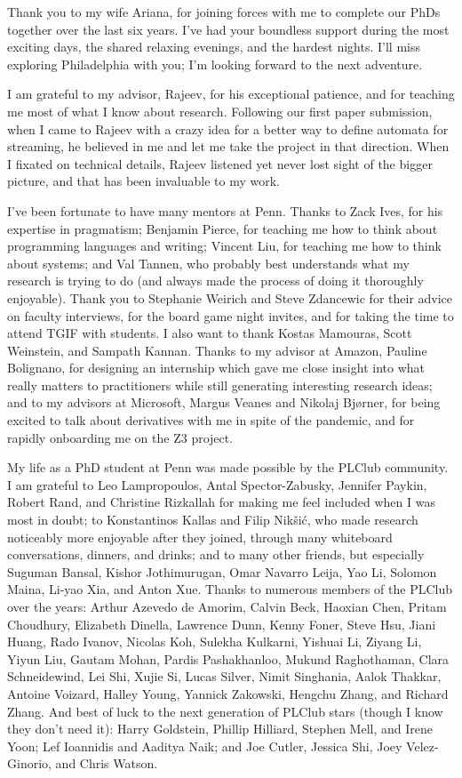 Thank you to my wife Ariana, for joining forces with me to complete our PhDs together over the last six years.
I've had your boundless support during the most exciting days, the shared relaxing evenings, and the hardest nights.
I'll miss exploring Philadelphia with you; I'm looking forward to the next adventure.

I am grateful to my advisor, Rajeev, for his exceptional patience, and for teaching me most of what I know about research.
Following our first paper submission, when I came to Rajeev with a crazy idea for a better way to define automata for streaming, he believed in me and let me take the project in that direction.
When I fixated on technical details, Rajeev listened yet never lost sight of the bigger picture, and that has been invaluable to my work.

I've been fortunate to have many mentors at Penn. Thanks to Zack Ives, for his expertise in pragmatism; Benjamin Pierce, for teaching me how to think about programming languages and writing; Vincent Liu, for teaching me how to think about systems; and Val Tannen, who probably best understands what my research is trying to do (and always made the process of doing it thoroughly enjoyable).
Thank you to Stephanie Weirich and Steve Zdancewic for their advice on faculty interviews, for the board game night invites, and for taking the time to attend TGIF with students.
I also want to thank Kostas Mamouras, Scott Weinstein, and Sampath Kannan.
Thanks to my advisor at Amazon, Pauline Bolignano, for designing an internship which gave me close insight into what really matters to practitioners while still generating interesting research ideas; and to my advisors at Microsoft, Margus Veanes and Nikolaj Bjørner,
for being excited to talk about derivatives with me in spite of the pandemic, and for rapidly onboarding me on the Z3 project.

My life as a PhD student at Penn was made possible by the PLClub community.
I am grateful to Leo Lampropoulos, Antal Spector-Zabusky, Jennifer Paykin, Robert Rand, and Christine Rizkallah for making me feel included when I was most in doubt;
to Konstantinos Kallas and Filip Nikšić, who made research noticeably more enjoyable after they joined, through many whiteboard conversations, dinners, and drinks;
and to many other friends, but especially Suguman Bansal, Kishor Jothimurugan, Omar Navarro Leija, Yao Li, Solomon Maina, Li-yao Xia, and Anton Xue.
Thanks to numerous members of the PLClub over the years:
Arthur Azevedo de Amorim,
Calvin Beck,
Haoxian Chen,
Pritam Choudhury,
Elizabeth Dinella,
Lawrence Dunn,
Kenny Foner,
Steve Hsu,
Jiani Huang,
Rado Ivanov,
Nicolas Koh,
Sulekha Kulkarni,
Yishuai Li,
Ziyang Li,
Yiyun Liu,
Gautam Mohan,
Pardis Pashakhanloo,
Mukund Raghothaman,
Clara Schneidewind,
Lei Shi,
Xujie Si,
Lucas Silver,
Nimit Singhania,
Aalok Thakkar,
Antoine Voizard,
Halley Young,
Yannick Zakowski,
Hengchu Zhang,
and
Richard Zhang.
And best of luck to the next generation of PLClub stars
(though I know they don't need it):
Harry Goldstein,
Phillip Hilliard,
Stephen Mell,
and Irene Yoon;
Lef Ioannidis
and Aaditya Naik;
and Joe Cutler, Jessica Shi, Joey Velez-Ginorio, and Chris Watson.


